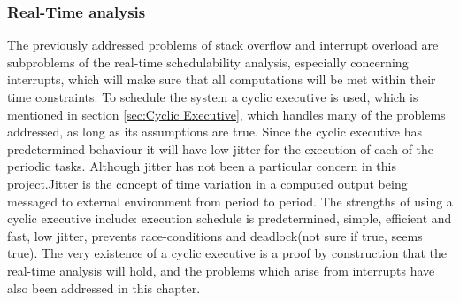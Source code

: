 \subsubsection{Real-Time analysis}
\label{sec:Real-Time analysis}
The previously addressed problems of stack overflow and interrupt overload are subproblems of the real-time schedulability analysis, especially concerning interrupts, which will make sure that all computations will be met within their time constraints. \newline
To schedule the system a cyclic executive is used, which is mentioned in section \ref{sec:Cyclic Executive}, which handles many of the problems addressed, as long as its assumptions are true. 
Since the cyclic executive has predetermined behaviour it will have low jitter for the execution of each of the periodic tasks. Although jitter has not been a particular concern in this project.\newline Jitter is the concept of time variation in a computed output being messaged to external environment from period to period. \newline
The strengths of using a cyclic executive include: execution schedule is predetermined, simple, efficient and fast, low jitter, prevents race-conditions and deadlock(not sure if true, seems true). 
The very existence of a cyclic executive is a proof by construction that the real-time analysis will hold, and the problems which arise from interrupts have also been addressed in this chapter.
